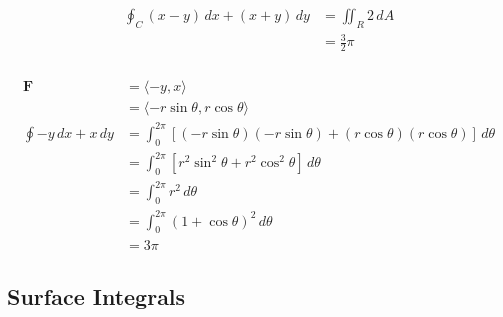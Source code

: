 \documentclass{article}
\begin{document}
\begin{align*}
  \oint_C (x - y) \,dx + (x + y) \,dy & = \iint_R 2 \,dA  \\
                                      & = \frac{3}{2} \pi
\end{align*}

\setcounter{subsubsection}{32}
\subsubsection{}

\begin{align*}
  \mathbf{F}             & = \langle -y, x \rangle                                                                          \\
                         & = \langle -r \sin \theta, r \cos \theta \rangle                                                  \\
  \oint -y \,dx + x \,dy & = \int_0^{2 \pi} [(-r \sin \theta) (-r \sin \theta) + (r \cos \theta) (r \cos \theta)] \,d\theta \\
                         & = \int_0^{2 \pi} [r^2 \sin^2 \theta + r^2 \cos^2 \theta] \,d\theta                               \\
                         & = \int_0^{2 \pi} r^2 \,d\theta                                                                   \\
                         & = \int_0^{2 \pi} (1 + \cos \theta)^2 \,d\theta                                                   \\
                         & = 3 \pi
\end{align*}

\subsection{Surface Integrals}

\subsubsection{}
\end{document}
